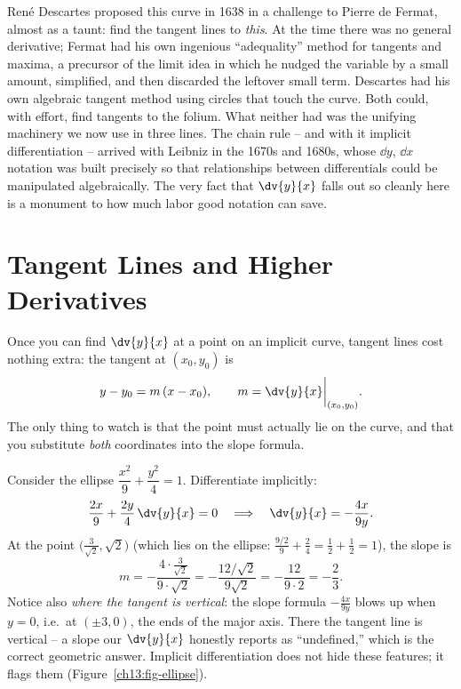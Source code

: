 \begin{historybox}
Ren\'e Descartes proposed this curve in 1638 in a challenge to Pierre de Fermat, almost as a taunt:
find the tangent lines to \emph{this}. At the time there was no general derivative; Fermat had his own
ingenious ``adequality'' method for tangents and maxima, a precursor of the limit idea in which he
nudged the variable by a small amount, simplified, and then discarded the leftover small term.
Descartes had his own algebraic tangent method using circles that touch the curve. Both could, with
effort, find tangents to the folium. What neither had was the unifying machinery we now use in three
lines. The chain rule -- and with it implicit differentiation -- arrived with Leibniz in the 1670s
and 1680s, whose $\dd y$, $\dd x$ notation was built precisely so that relationships between
differentials could be manipulated algebraically. The very fact that $\dv{y}{x}$ falls out so
cleanly here is a monument to how much labor good notation can save.
\end{historybox}

\section{Tangent Lines and Higher Derivatives}
\label{ch13:tangents}

Once you can find $\dv{y}{x}$ at a point on an implicit curve, tangent lines cost nothing extra: the
tangent at $(x_0,y_0)$ is
\[
y - y_0 = m\,(x - x_0), \qquad m = \dv{y}{x}\bigg|_{(x_0,y_0)}.
\]
The only thing to watch is that the point must actually lie on the curve, and that you substitute
\emph{both} coordinates into the slope formula.

\begin{example}
\label{ch13:ex-ellipse}
Consider the ellipse $\dfrac{x^2}{9} + \dfrac{y^2}{4} = 1$. Differentiate implicitly:
\[
\frac{2x}{9} + \frac{2y}{4}\,\dv{y}{x} = 0
\quad\Longrightarrow\quad
\dv{y}{x} = -\frac{4x}{9y}.
\]
At the point $\big(\tfrac{3}{\sqrt2}, \sqrt2\big)$ (which lies on the ellipse: $\tfrac{9/2}{9} +
\tfrac{2}{4} = \tfrac12 + \tfrac12 = 1$), the slope is
\[
m = -\frac{4\cdot \tfrac{3}{\sqrt2}}{9\cdot \sqrt2} = -\frac{12/\sqrt2}{9\sqrt2}
= -\frac{12}{9\cdot 2} = -\frac{2}{3}.
\]
Notice also \emph{where the tangent is vertical}: the slope formula $-\tfrac{4x}{9y}$ blows up when
$y=0$, i.e.\ at $(\pm 3, 0)$, the ends of the major axis. There the tangent line is vertical -- a
slope our $\dv{y}{x}$ honestly reports as ``undefined,'' which is the correct geometric answer.
Implicit differentiation does not hide these features; it flags them
(Figure~\ref{ch13:fig-ellipse}).
\end{example}

